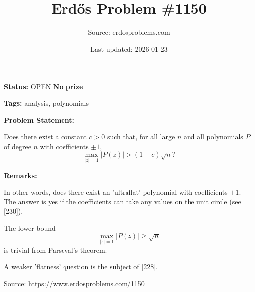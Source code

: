 \documentclass{article}
\title{Erd\H{o}s Problem \#1150}
\date{Last updated: 2026-01-23}
\author{Source: erdosproblems.com}
\begin{document}
\maketitle

\noindent\textbf{Status:} OPEN \quad \textbf{No prize}

\noindent\textbf{Tags:} analysis, polynomials

\medskip
\noindent\textbf{Problem Statement:}

Does there exist a constant $c>0$ such that, for all large $n$ and all polynomials $P$ of degree $n$ with coefficients $\pm 1$,\[\max_{\lvert z\rvert=1}\lvert P(z)\rvert > (1+c)\sqrt{n}?\]

\bigskip
\noindent\textbf{Remarks:}

In other words, does there exist an 'ultraflat' polynomial with coefficients $\pm 1$. The answer is yes if the coefficients can take any values on the unit circle (see [230]).

The lower bound\[\max_{\lvert z\rvert=1}\lvert P(z)\rvert\geq \sqrt{n}\]is trivial from Parseval's theorem.

A weaker 'flatness' question is the subject of [228].

\bigskip
\noindent\small{Source: \url{https://www.erdosproblems.com/1150}}
\end{document}
